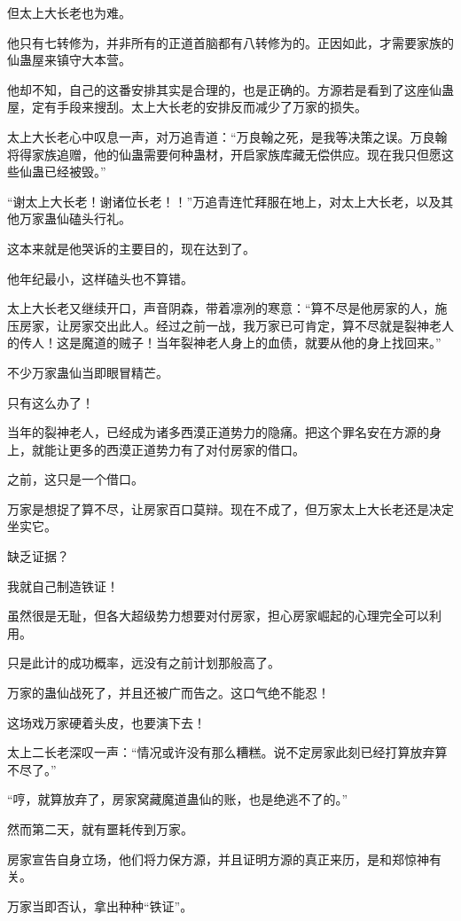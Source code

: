 \begin{this_body}
但太上大长老也为难。

他只有七转修为，并非所有的正道首脑都有八转修为的。正因如此，才需要家族的仙蛊屋来镇守大本营。

他却不知，自己的这番安排其实是合理的，也是正确的。方源若是看到了这座仙蛊屋，定有手段来搜刮。太上大长老的安排反而减少了万家的损失。

太上大长老心中叹息一声，对万追青道：“万良翰之死，是我等决策之误。万良翰将得家族追赠，他的仙蛊需要何种蛊材，开启家族库藏无偿供应。现在我只但愿这些仙蛊已经被毁。”

“谢太上大长老！谢诸位长老！！”万追青连忙拜服在地上，对太上大长老，以及其他万家蛊仙磕头行礼。

这本来就是他哭诉的主要目的，现在达到了。

他年纪最小，这样磕头也不算错。

太上大长老又继续开口，声音阴森，带着凛冽的寒意：“算不尽是他房家的人，施压房家，让房家交出此人。经过之前一战，我万家已可肯定，算不尽就是裂神老人的传人！这是魔道的贼子！当年裂神老人身上的血债，就要从他的身上找回来。”

不少万家蛊仙当即眼冒精芒。

只有这么办了！

当年的裂神老人，已经成为诸多西漠正道势力的隐痛。把这个罪名安在方源的身上，就能让更多的西漠正道势力有了对付房家的借口。

之前，这只是一个借口。

万家是想捉了算不尽，让房家百口莫辩。现在不成了，但万家太上大长老还是决定坐实它。

缺乏证据？

我就自己制造铁证！

虽然很是无耻，但各大超级势力想要对付房家，担心房家崛起的心理完全可以利用。

只是此计的成功概率，远没有之前计划那般高了。

万家的蛊仙战死了，并且还被广而告之。这口气绝不能忍！

这场戏万家硬着头皮，也要演下去！

太上二长老深叹一声：“情况或许没有那么糟糕。说不定房家此刻已经打算放弃算不尽了。”

“哼，就算放弃了，房家窝藏魔道蛊仙的账，也是绝逃不了的。”

然而第二天，就有噩耗传到万家。

房家宣告自身立场，他们将力保方源，并且证明方源的真正来历，是和郑惊神有关。

万家当即否认，拿出种种“铁证”。


\end{this_body}
